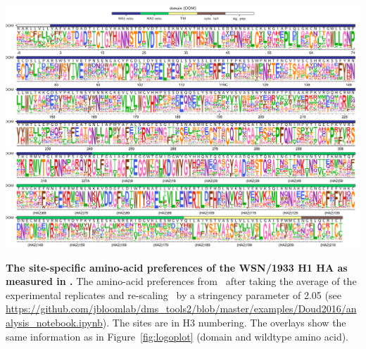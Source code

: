 \documentclass[9pt,twocolumn,twoside]{pnas-new}
\begin{document}
\begin{suppfigure}[H]
\centerline{\includegraphics[width=\textwidth]{figs/S03_WSNprefs_logoplot/WSN-rescaled_prefs.pdf}}
\caption{\label{suppfig:WSNprefs_logoplot}
{\bf The site-specific amino-acid preferences of the WSN/1933 H1 HA as measured in \cite{doud2016accurate}.}
The amino-acid preferences from~\cite{doud2016accurate} after taking the average of the experimental replicates and re-scaling~\cite{hilton2017phydms} by a stringency parameter of 2.05 (see \url{https://github.com/jbloomlab/dms_tools2/blob/master/examples/Doud2016/analysis_notebook.ipynb}).
The sites are in H3 numbering.
The overlays show the same information as in Figure~\ref{fig:logoplot} (domain and wildtype amino acid).
}
\end{suppfigure}
\end{document}
